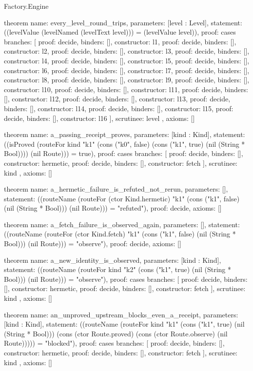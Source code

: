 \begin{lexlean}{Factory.Engine}
\begin{semanticmodule}
theorem{
  name: every_level_round_trips,
  parameters: [level : Level],
  statement: ((levelValue (levelNamed (levelText level))) = (levelValue level)),
  proof: cases{
    branches: [
      {proof: decide{}, binders: [], constructor: l1},
      {proof: decide{}, binders: [], constructor: l2},
      {proof: decide{}, binders: [], constructor: l3},
      {proof: decide{}, binders: [], constructor: l4},
      {proof: decide{}, binders: [], constructor: l5},
      {proof: decide{}, binders: [], constructor: l6},
      {proof: decide{}, binders: [], constructor: l7},
      {proof: decide{}, binders: [], constructor: l8},
      {proof: decide{}, binders: [], constructor: l9},
      {proof: decide{}, binders: [], constructor: l10},
      {proof: decide{}, binders: [], constructor: l11},
      {proof: decide{}, binders: [], constructor: l12},
      {proof: decide{}, binders: [], constructor: l13},
      {proof: decide{}, binders: [], constructor: l14},
      {proof: decide{}, binders: [], constructor: l15},
      {proof: decide{}, binders: [], constructor: l16}
    ],
    scrutinee: level
  },
  axioms: []
}

theorem{
  name: a_passing_receipt_proves,
  parameters: [kind : Kind],
  statement: ((isProved (routeFor kind "k1" (cons ("k0", false) (cons ("k1", true) (nil (String * Bool)))) (nil Route))) = true),
  proof: cases{
    branches: [
      {proof: decide{}, binders: [], constructor: hermetic},
      {proof: decide{}, binders: [], constructor: fetch}
    ],
    scrutinee: kind
  },
  axioms: []
}

theorem{
  name: a_hermetic_failure_is_refuted_not_rerun,
  parameters: [],
  statement: ((routeName (routeFor (ctor Kind.hermetic) "k1" (cons ("k1", false) (nil (String * Bool))) (nil Route))) = "refuted"),
  proof: decide{},
  axioms: []
}

theorem{
  name: a_fetch_failure_is_observed_again,
  parameters: [],
  statement: ((routeName (routeFor (ctor Kind.fetch) "k1" (cons ("k1", false) (nil (String * Bool))) (nil Route))) = "observe"),
  proof: decide{},
  axioms: []
}

theorem{
  name: a_new_identity_is_observed,
  parameters: [kind : Kind],
  statement: ((routeName (routeFor kind "k2" (cons ("k1", true) (nil (String * Bool))) (nil Route))) = "observe"),
  proof: cases{
    branches: [
      {proof: decide{}, binders: [], constructor: hermetic},
      {proof: decide{}, binders: [], constructor: fetch}
    ],
    scrutinee: kind
  },
  axioms: []
}

theorem{
  name: an_unproved_upstream_blocks_even_a_receipt,
  parameters: [kind : Kind],
  statement: ((routeName (routeFor kind "k1" (cons ("k1", true) (nil (String * Bool))) (cons (ctor Route.proved) (cons (ctor Route.observe) (nil Route))))) = "blocked"),
  proof: cases{
    branches: [
      {proof: decide{}, binders: [], constructor: hermetic},
      {proof: decide{}, binders: [], constructor: fetch}
    ],
    scrutinee: kind
  },
  axioms: []
}


\end{semanticmodule}
\end{lexlean}
